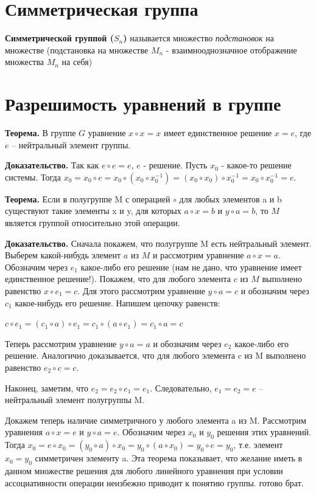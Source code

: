 \documentclass[a4paper]{article}
\begin{document}
{\begin{small}
\section*{Симметрическая группа}
\textbf{Симметрической группой ($S_n$)} называется множество \textit{подстановок} на множестве (подстановка на множестве $M_n$ - взаимнооднозначное отображение множества $M_n$ на себя)

\section*{Разрешимость уравнений в группе
}

\textbf{Теорема.}  В группе  $G$ уравнение $x \circ x = x$ имеет
единственное решение $x = e$, где $e$ – нейтральный элемент группы.

\textbf{Доказательство.} Так как $e \circ e = e$, $e$ - решение. Пусть $x_0$ - какое-то решение системы. Тогда $x_0 = x_0 \circ e = x_0 \circ (x_0 \circ x_0^{-1}) = (x_0 \circ x_0) \circ x_0^{-1} = x_0 \circ x_0^{-1} = e$.

\textbf{Теорема.} Если в полугруппе M с операцией $\circ$ для любых элементов a и b
существуют такие элементы x и y, для которых $a \circ x = b$ и $y \circ a  = b$, то $M$ является группой относительно этой операции.

\textbf{Доказательство.} Сначала покажем, что полугруппе M есть нейтральный
элемент. Выберем какой-нибудь элемент $a$ из $M$ и рассмотрим уравнение $a \circ x = a$. Обозначим через $e_1$ какое-либо его решение (нам не дано, что уравнение
имеет единственное решение!). Покажем, что для любого элемента $c$ из $M$
выполнено равенство $x \circ e_1 = c$.  Для этого рассмотрим уравнение $y \circ a  = c$ и обозначим через $c_1$ какое-нибудь его решение. Напишем цепочку равенств:

$c \circ e_1 = (c_1 \circ a ) \circ e_1 = c_1 \circ ( a \circ e_1) = c_1 \circ a = c$

Теперь рассмотрим уравнение $y \circ a = a$ и обозначим через $e_2$ какое-либо его
решение. Аналогично доказывается, что для любого элемента c из M
выполнено равенство $e_2 \circ c = c$.

Наконец, заметим, что $e_2 = e_2 \circ e_1 = e_1$. Следовательно, $e_1 = e_2 = e$ –
нейтральный элемент полугруппы M.

Докажем теперь наличие симметричного у любого элемента a из M.
Рассмотрим уравнения $a \circ x = e$ и $y \circ a = e$. Обозначим через $x_0$ и $y_0$ решения
этих уравнений. Тогда $x_0 = e \circ x_0 = (y_0 \circ a) \circ x_0 = y_0 \circ (a \circ x_0) = y_0 \circ e = y_0$, т.е.
элемент $x_0 = y_0$ симметричен элементу a.
Эта теорема показывает, что желание иметь в данном множестве решения
для любого линейного уравнения при условии ассоциативности операции
неизбежно приводит к понятию группы. готово брат.


\end{small}}
\end{document}

